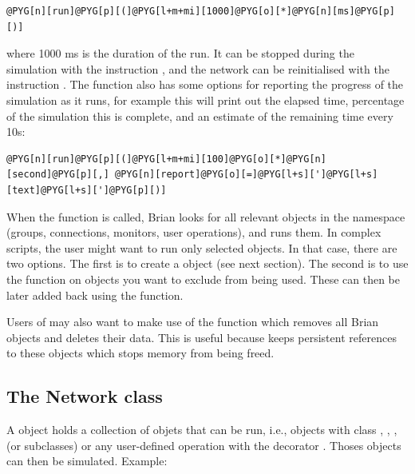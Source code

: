 \documentclass[letterpaper,10pt,english]{manual}
\begin{document}
\begin{Verbatim}[commandchars=@\[\]]
@PYG[n][run]@PYG[p][(]@PYG[l+m+mi][1000]@PYG[o][*]@PYG[n][ms]@PYG[p][)]
\end{Verbatim}

where 1000 ms is the duration of the run. It can be stopped during the simulation with the instruction
\hyperlink{brian.stop}{}, and the network can be reinitialised with the instruction \hyperlink{brian.reinit}{}.
The \hyperlink{brian.run}{} function also has some options for reporting the progress of the
simulation as it runs, for example this will print out the elapsed time,
percentage of the simulation this is complete, and an estimate of the
remaining time every 10s:

\begin{Verbatim}[commandchars=@\[\]]
@PYG[n][run]@PYG[p][(]@PYG[l+m+mi][100]@PYG[o][*]@PYG[n][second]@PYG[p][,] @PYG[n][report]@PYG[o][=]@PYG[l+s][']@PYG[l+s][text]@PYG[l+s][']@PYG[p][)]
\end{Verbatim}

When the \hyperlink{brian.run}{} function is called, Brian looks for all relevant
objects in the namespace (groups, connections, monitors, user operations), and runs them.
In complex scripts, the user might want to run only selected objects. In that
case, there are two options. The first is to create a \hyperlink{brian.Network}{} object
(see next section). The second is to use the \hyperlink{brian.forget}{} function on objects
you want to exclude from being used. These can then be later added back using
the \hyperlink{brian.recall}{} function.

Users of  may also want to make use of the \hyperlink{brian.clear}{} function which removes all Brian objects
and deletes their data. This is useful because  keeps persistent references to these objects
which stops memory from being freed.


\subsection{The Network class}

A \hyperlink{brian.Network}{} object holds a collection of objets that can be run, i.e., objects with class \hyperlink{brian.NeuronGroup}{},
\hyperlink{brian.Connection}{}, \hyperlink{brian.SpikeMonitor}{}, \hyperlink{brian.StateMonitor}{} (or subclasses) or any user-defined operation with the decorator
\hyperlink{brian.network_operation}{}. Thoses objects can then be simulated. Example:
\end{document}
